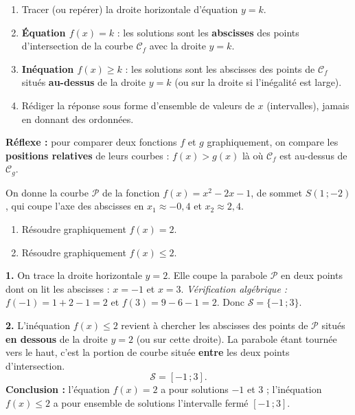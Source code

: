 \documentclass[11pt]{article}
\begin{document}
\begin{methode}[Exploiter une courbe pour résoudre $f(x)=k$ ou $f(x)\geq k$]
\begin{enumerate}
\item Tracer (ou repérer) la droite horizontale d'équation $y=k$.
\item \textbf{Équation $f(x)=k$} : les solutions sont les \textbf{abscisses} des points d'intersection de la courbe $\mathcal{C}_f$ avec la droite $y=k$.
\item \textbf{Inéquation $f(x)\geq k$} : les solutions sont les abscisses des points de $\mathcal{C}_f$ situés \textbf{au-dessus} de la droite $y=k$ (ou sur la droite si l'inégalité est large).
\item Rédiger la réponse sous forme d'ensemble de valeurs de $x$ (intervalles), jamais en donnant des ordonnées.
\end{enumerate}
\textbf{Réflexe :} pour comparer deux fonctions $f$ et $g$ graphiquement, on compare les \textbf{positions relatives} de leurs courbes : $f(x)>g(x)$ là où $\mathcal{C}_f$ est au-dessus de $\mathcal{C}_g$.
\end{methode}

\begin{exoresolu}
On donne la courbe $\mathcal{P}$ de la fonction $f(x)=x^2-2x-1$, de sommet $S(1\,;-2)$, qui coupe l'axe des abscisses en $x_1\approx -0{,}4$ et $x_2\approx 2{,}4$.
\begin{enumerate}
\item Résoudre graphiquement $f(x)=2$.
\item Résoudre graphiquement $f(x)\leq 2$.
\end{enumerate}
\tcblower
\textbf{1.} On trace la droite horizontale $y=2$. Elle coupe la parabole $\mathcal{P}$ en deux points dont on lit les abscisses : $x=-1$ et $x=3$.
\textit{Vérification algébrique :} $f(-1)=1+2-1=2$ et $f(3)=9-6-1=2$. 
Donc $\mathcal{S}=\{-1\,;3\}$.

\textbf{2.} L'inéquation $f(x)\leq 2$ revient à chercher les abscisses des points de $\mathcal{P}$ situés \textbf{en dessous} de la droite $y=2$ (ou sur cette droite). La parabole étant tournée vers le haut, c'est la portion de courbe située \textbf{entre} les deux points d'intersection.
\[ \mathcal{S}=[-1\,;3]. \]
\textbf{Conclusion :} l'équation $f(x)=2$ a pour solutions $-1$ et $3$ ; l'inéquation $f(x)\leq 2$ a pour ensemble de solutions l'intervalle fermé $[-1\,;3]$.
\end{exoresolu}
\end{document}
